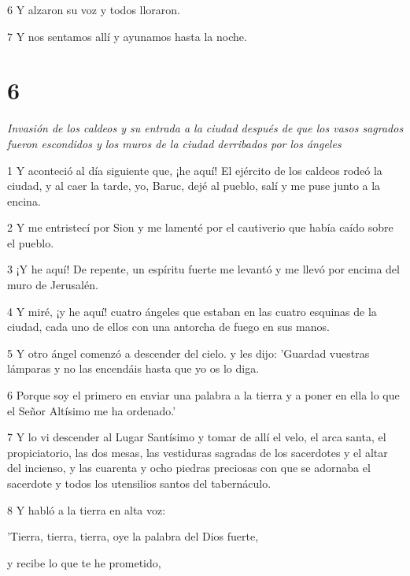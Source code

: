 \par 6 Y alzaron su voz y todos lloraron.

\par 7 Y nos sentamos allí y ayunamos hasta la noche.

\chapter{6}

\par \textit{Invasión de los caldeos y su entrada a la ciudad después de que los vasos sagrados fueron escondidos y los muros de la ciudad derribados por los ángeles}

\par 1 Y aconteció al día siguiente que, ¡he aquí! El ejército de los caldeos rodeó la ciudad, y al caer la tarde, yo, Baruc, dejé al pueblo, salí y me puse junto a la encina.

\par 2 Y me entristecí por Sion y me lamenté por el cautiverio que había caído sobre el pueblo.

\par 3 ¡Y he aquí! De repente, un espíritu fuerte me levantó y me llevó por encima del muro de Jerusalén.

\par 4 Y miré, ¡y he aquí! cuatro ángeles que estaban en las cuatro esquinas de la ciudad, cada uno de ellos con una antorcha de fuego en sus manos.

\par 5 Y otro ángel comenzó a descender del cielo. y les dijo: 'Guardad vuestras lámparas y no las encendáis hasta que yo os lo diga.

\par 6 Porque soy el primero en enviar una palabra a la tierra y a poner en ella lo que el Señor Altísimo me ha ordenado.'

\par 7 Y lo vi descender al Lugar Santísimo y tomar de allí el velo, el arca santa, el propiciatorio, las dos mesas, las vestiduras sagradas de los sacerdotes y el altar del incienso, y las cuarenta y ocho piedras preciosas con que se adornaba el sacerdote y todos los utensilios santos del tabernáculo.

\par 8 Y habló a la tierra en alta voz:

'Tierra, tierra, tierra, oye la palabra del Dios fuerte,

\par y recibe lo que te he prometido,

